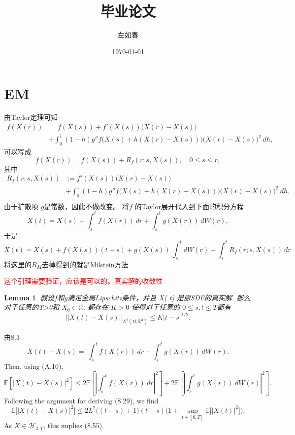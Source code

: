 \documentclass[12pt,final]{article}
\title{毕业论文}
\author{左如春}
\date{\today}
\makeatletter
\theoremstyle{plain}
\renewcommand{\proofname}{proof}
\newtheorem{Lemma}[Theorem]{Lemma}      %
\theoremstyle{Definition}
\theoremstyle{Remark}
\renewenvironment{proof}[1][\proofname]{\par
	\pushQED{\qed}%
	\normalfont \topsep6\p@\@plus6\p@\relax
	\trivlist\item[\hskip\labelsep
	\bfseries #1\@addpunct{\,:\,}]\ignorespaces
}{%
	\popQED\endtrivlist\@endpefalse
}
\makeatother
\begin{document}
	
	\maketitle
	
	
	\section{EM}
	由Taylor定理可知
	$$\begin{aligned}
		f(X(r))&=f(X(s))+f'(X(s))\big(X(r)-X(s)\big)\\&+\int_{0}^{1}(1-h)g''f\big(X(s)+h(X(r)-X(s))\big)\big(X(r)-X(s)\big)^{2}\:dh,
	\end{aligned}$$
	可以写成
	$$f(X(r))=f(X(s))+R_f(r;s,X(s)),\quad0\leq s\leq r,$$
	其中
	$$\begin{aligned}
		R_{f}(r;s,X(s))&:=f'(X(s))\big(X(r)-X(s)\big)\\&+\int_{0}^{1}(1-h)g''f\big(X(s)+h(X(r)-X(s))\big)\big(X(r)-X(s)\big)^{2}\:dh.\\
	\end{aligned}$$
	由于扩散项 $g$是常数，因此不做改变。
	将$f$ 的Taylor展开代入到下面的积分方程
	\begin{equation}\label{int}
		X(t)=X(s)+\int_s^tf(X(r))\:dr+\int_s^tg(X(r))\:dW(r),
	\end{equation}
	于是
	\begin{equation}\label{Mil}
		X(t)=X(s)+f(X(s))(t-s)+g(X(s))\:\int_{s}^{t}dW(r)+\int_{s}^{t}R_{f}(r;s,X(s))\:dr
	\end{equation}
	将这里的$R_M$去掉得到的就是Milstein方法
	
	\textcolor{red}{这个引理需要验证，应该是可以的。真实解的收敛性}
	\begin{Lemma}
		假设$f$和$g$满足全局Lipschitz条件，并且  X( t) 是原SDE的真实解. 那么对于任意的T>0和
		${X}_{0}\in \mathbb{R}$, 都存在 $K> 0$ 使得对于任意的 $0\leq s, t\leq T$都有
		\begin{equation}
			||X(t)-X(s)||_{L^2(\Omega,\mathbb{R}^d)}\leq K|t-s|^{1/2}.
		\end{equation}
	\end{Lemma}
	
	\begin{proof}
		由8.3
		$$X(t)-X(s)=\:\int_{s}^{t}f(X(r))\:dr+\int_{s}^{t}g(X(r))\:dW(r).$$
		Then, using (A.10),
		$$\mathbb{E}\left[\left|X(t)-X(s)\right|^2\right]\leq2\mathbb{E}\left[\left|\int_s^tf(X(r))\:dr\right|^2\right]+2\mathbb{E}\left[\left|\int_s^tg(X(r))\:dW(r)\right|^2\right].$$
		Following the argument for deriving (8.29), we find
		$$\mathbb{E}\Big[\left|X(t)-X(s)\right|^2\Big]\leq2L^2\big((t-s)+1\big)(t-s)\bigg(1+\sup\limits_{t\in[0,T]}\mathbb{E}\Big[\left|X(t)\right|^2\bigg]\bigg).$$
		As $X\in\mathcal{H}_{2,T}$, this implies (8.55).
	\end{proof} 
	
\end{document}
